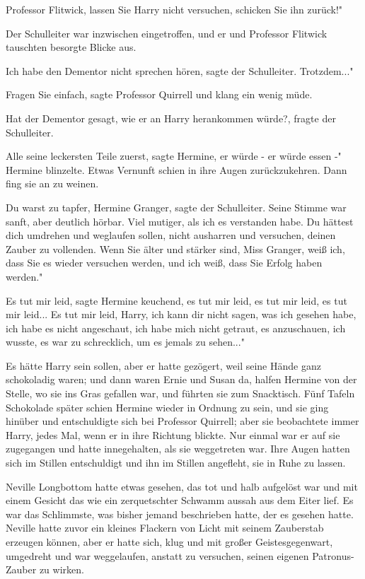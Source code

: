\glqq{}Professor Flitwick, lassen Sie Harry nicht versuchen, schicken Sie ihn
zurück!"

Der Schulleiter war inzwischen eingetroffen, und er und Professor Flitwick
tauschten besorgte Blicke aus.

\glqq{}Ich habe den Dementor nicht sprechen hören\grqq{}, sagte der Schulleiter.
\glqq{}Trotzdem..."

\glqq{}Fragen Sie einfach\grqq{}, sagte Professor Quirrell und klang ein wenig
müde.

\glqq{}Hat der Dementor gesagt, wie er an Harry herankommen würde?\grqq{}, fragte
der Schulleiter.

\glqq{}Alle seine leckersten Teile zuerst\grqq{}, sagte Hermine, \glqq{}er würde -
er würde essen -" Hermine blinzelte. Etwas Vernunft schien in ihre Augen
zurückzukehren. Dann fing sie an zu weinen.

\glqq{}Du warst zu tapfer, Hermine Granger\grqq{}, sagte der Schulleiter. Seine
Stimme war sanft, aber deutlich hörbar. \glqq{}Viel mutiger, als ich es
verstanden habe. Du hättest dich umdrehen und weglaufen sollen, nicht ausharren
und versuchen, deinen Zauber zu vollenden. Wenn Sie älter und stärker sind, Miss
Granger, weiß ich, dass Sie es wieder versuchen werden, und ich weiß, dass Sie
Erfolg haben werden."

\glqq{}Es tut mir leid\grqq{}, sagte Hermine keuchend, \glqq{}es tut mir leid, es
tut mir leid, es tut mir leid... Es tut mir leid, Harry, ich kann dir nicht
sagen, was ich gesehen habe, ich habe es nicht angeschaut, ich habe mich nicht
getraut, es anzuschauen, ich wusste, es war zu schrecklich, um es jemals zu
sehen..."

Es hätte Harry sein sollen, aber er hatte gezögert, weil seine Hände ganz
schokoladig waren; und dann waren Ernie und Susan da, halfen Hermine von der
Stelle, wo sie ins Gras gefallen war, und führten sie zum Snacktisch. Fünf
Tafeln Schokolade später schien Hermine wieder in Ordnung zu sein, und sie ging
hinüber und entschuldigte sich bei Professor Quirrell; aber sie beobachtete
immer Harry, jedes Mal, wenn er in ihre Richtung blickte. Nur einmal war er auf
sie zugegangen und hatte innegehalten, als sie weggetreten war. Ihre Augen
hatten sich im Stillen entschuldigt und ihn im Stillen angefleht, sie in Ruhe zu
lassen.

Neville Longbottom hatte etwas gesehen, das tot und halb aufgelöst war und mit
einem Gesicht das wie ein zerquetschter Schwamm aussah aus dem Eiter lief. Es
war das Schlimmste, was bisher jemand beschrieben hatte, der es gesehen hatte.
Neville hatte zuvor ein kleines Flackern von Licht mit seinem Zauberstab
erzeugen können, aber er hatte sich, klug und mit großer Geistesgegenwart,
umgedreht und war weggelaufen, anstatt zu versuchen, seinen eigenen
Patronus-Zauber zu wirken.

